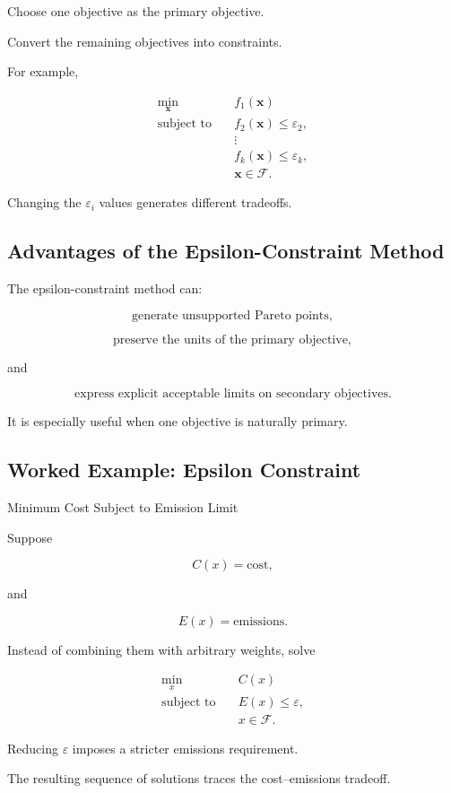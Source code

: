 Choose one objective as the primary objective.

Convert the remaining objectives into constraints.

For example,

\[
\boxed{
\begin{aligned}
\min_{\mathbf{x}}
\quad&
f_1(\mathbf{x})
\\
\text{subject to}
\quad&
f_2(\mathbf{x})
\leq
\varepsilon_2,
\\
&
\vdots
\\
&
f_k(\mathbf{x})
\leq
\varepsilon_k,
\\
&
\mathbf{x}\in\mathcal{F}.
\end{aligned}
}
\]

Changing the \(\varepsilon_i\) values generates different tradeoffs.

\subsection{Advantages of the Epsilon-Constraint Method}
\label{subsec:epsilon-constraint-advantages}

The epsilon-constraint method can:

\[
\boxed{
\text{generate unsupported Pareto points},
}
\]

\[
\boxed{
\text{preserve the units of the primary objective},
}
\]

and

\[
\boxed{
\text{express explicit acceptable limits on secondary objectives}.
}
\]

It is especially useful when one objective is naturally primary.

\subsection{Worked Example: Epsilon Constraint}
\label{subsec:worked-epsilon-constraint}

\begin{workedexamplebox}{Minimum Cost Subject to Emission Limit}

Suppose

\[
C(x)
=
\text{cost},
\]

and

\[
E(x)
=
\text{emissions}.
\]

Instead of combining them with arbitrary weights, solve

\[
\boxed{
\begin{aligned}
\min_x
\quad&
C(x)
\\
\text{subject to}
\quad&
E(x)\leq\varepsilon,
\\
&
x\in\mathcal{F}.
\end{aligned}
}
\]

Reducing \(\varepsilon\) imposes a stricter emissions requirement.

The resulting sequence of solutions traces the cost--emissions tradeoff.

\end{workedexamplebox}

